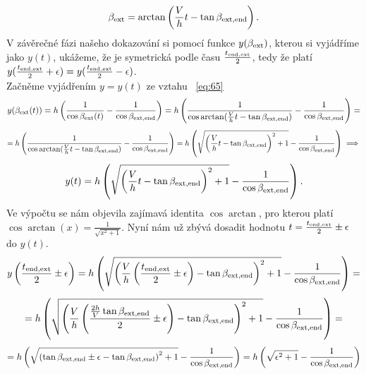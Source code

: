 \documentclass[reqno, a4paper]{amsart}
\begin{document}
\begin{equation}
	\label{eq:78}
	\beta_{\mathrm{ext}}=\arctan\left( \frac{V}{h}t - \tan \beta_{\mathrm{ext}, \mathrm{end}}\right) .
\end{equation}
V závěrečné fázi našeho dokazování si pomocí funkce $y(\beta_{\mathrm{ext}})$, kterou si vyjádříme jako $y(t)$, ukážeme, že je symetrická podle času $\frac{t_{\mathrm{end}, \mathrm{ext}}}{2}$, tedy že platí $y(\frac{t_{\mathrm{end}, \mathrm{ext}}}{2}+\epsilon)=y(\frac{t_{\mathrm{end}, \mathrm{ext}}}{2}-\epsilon)$.\\
Začněme vyjádřením $y=y(t)$ ze vztahu ~\eqref{eq:65}
\begin{equation*}
	y(\beta_{\mathrm{ext}}(t))=h
	\left(
	\frac{1}{\cos \beta_{\mathrm{ext}}(t)}
	-
	\frac{1}{\cos \beta_{\mathrm{ext}, \mathrm{end}}}
	\right)=h
	\left(
	\frac{1}{\cos \arctan(\frac{V}{h}t - \tan \beta_{\mathrm{ext}, \mathrm{end}})}
	-
	\frac{1}{\cos \beta_{\mathrm{ext}, \mathrm{end}}}
	\right)=
\end{equation*}
\begin{equation*}
	=h
	\left(
	\frac{1}{\cos \arctan(\frac{V}{h}t - \tan \beta_{\mathrm{ext}, \mathrm{end}})}
	-
	\frac{1}{\cos \beta_{\mathrm{ext}, \mathrm{end}}}
	\right)=h\left(
	\sqrt{\left( \frac{V}{h}t-\tan \beta_{\mathrm{ext}, \mathrm{end}}\right)^2 + 1 }
	-
	\frac{1}{\cos \beta_{\mathrm{ext}, \mathrm{end}}}
	\right) \implies
\end{equation*}
\begin{equation}
	\label{eq:80}
	y(t)=h\left(
	\sqrt{\left( \frac{V}{h}t-\tan \beta_{\mathrm{ext}, \mathrm{end}}\right)^2 + 1 }
	-
	\frac{1}{\cos \beta_{\mathrm{ext}, \mathrm{end}}}
	\right).
\end{equation}
Ve výpočtu se nám objevila zajímavá identita $\cos \arctan$, pro kterou platí $\cos \arctan (x)=\frac{1}{\sqrt{x^2+1}}$. Nyní nám už zbývá dosadit hodnotu $t = \frac{ t_{\mathrm{end}, \mathrm{ext}}}{2}\pm\epsilon$ do $y(t)$.
\begin{equation*}
	y\left( \frac{ t_{\mathrm{end}, \mathrm{ext}}}{2}\pm\epsilon\right) =h\left(
	\sqrt{\left( \frac{V}{h}\left( \frac{ t_{\mathrm{end}, \mathrm{ext}}}{2}\pm\epsilon\right) -\tan \beta_{\mathrm{ext}, \mathrm{end}}\right)^2 + 1 }
	-
	\frac{1}{\cos \beta_{\mathrm{ext}, \mathrm{end}}}
	\right)=
\end{equation*}
\begin{equation*}
	=h\left(
	\sqrt{\left( \frac{V}{h}\left( \frac{\frac{2h}{V}\tan\beta_{\mathrm{ext}, \mathrm{end}}}{2}\pm\epsilon\right) -\tan \beta_{\mathrm{ext}, \mathrm{end}}\right)^2 + 1 }
	-
	\frac{1}{\cos \beta_{\mathrm{ext}, \mathrm{end}}}
	\right)=
\end{equation*}
\begin{equation}
	\label{eq:81}
	=h\left(
	\sqrt{\left( \tan \beta_{\mathrm{ext}, \mathrm{end}}\pm\epsilon -\tan \beta_{\mathrm{ext}, \mathrm{end}}\right)^2 + 1 }
	-
	\frac{1}{\cos \beta_{\mathrm{ext}, \mathrm{end}}}
	\right)=h\left(\sqrt{\epsilon^2+1}-\frac{1}{\cos \beta_{\mathrm{ext}, \mathrm{end}}}
	\right)
\end{equation}
\end{document}

